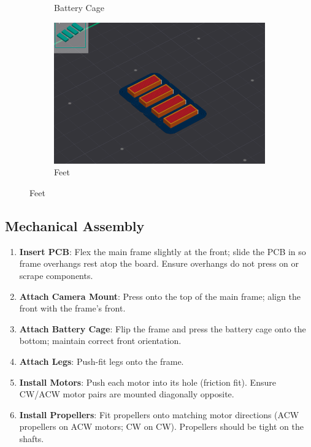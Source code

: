 \begin{figure}[H]
\begin{subfigure}[b]{0.48\linewidth}
    \caption{Battery Cage}
  \end{subfigure}
  \hfill
  \begin{subfigure}[b]{0.48\linewidth}
    \centering
    \includegraphics[width=\linewidth]{img/manual/3dp4.png}
    \caption{Feet}
  \end{subfigure}
\end{figure}


\subsection*{Mechanical Assembly}
\begin{enumerate}
  \item \textbf{Insert PCB}: Flex the main frame slightly at the front; slide the PCB in so frame overhangs rest atop the board. Ensure overhangs do not press on or scrape components.
  \item \textbf{Attach Camera Mount}: Press onto the top of the main frame; align the front with the frame’s front.
  \item \textbf{Attach Battery Cage}: Flip the frame and press the battery cage onto the bottom; maintain correct front orientation.
  \item \textbf{Attach Legs}: Push-fit legs onto the frame.
  \item \textbf{Install Motors}: Push each motor into its hole (friction fit). Ensure CW/ACW motor pairs are mounted diagonally opposite.
  \item \textbf{Install Propellers}: Fit propellers onto matching motor directions (ACW propellers on ACW motors; CW on CW). Propellers should be tight on the shafts.
\end{enumerate}

